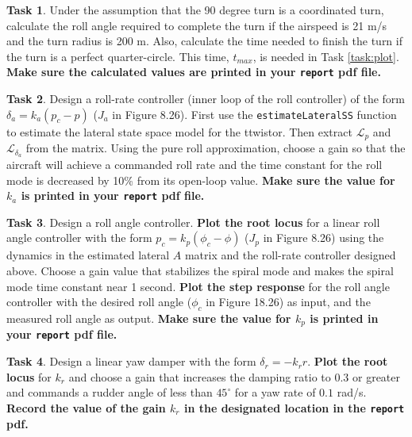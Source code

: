 \documentclass{article}
\theoremstyle{definition}
\newtheorem{task}{Task}
\begin{document}
\begin{task}
    Under the assumption that the 90 degree turn is a coordinated turn, calculate the roll angle required to complete the turn if the airspeed is 21 m/s and the turn radius is 200 m. Also, calculate the time needed to finish the turn if the turn is a perfect quarter-circle. This time, $t_{max}$, is needed in Task \ref{task:plot}. \textbf{Make sure the calculated values are printed in your \texttt{report} pdf file.}
\end{task}

\begin{task} \label{task:rollrate}
    Design a roll-rate controller (inner loop of the roll controller) of the form $\delta_a = k_a (p_c - p)$ ($J_a$ in Figure 8.26). First use the \texttt{estimateLateralSS} function to estimate the lateral state space model for the ttwistor. Then extract $\mathcal{L}_p$ and $\mathcal{L}_{\delta_a}$ from the matrix. Using the pure roll approximation, choose a gain so that the aircraft will achieve a commanded roll rate and the time constant for the roll mode is decreased by 10\% from its open-loop value.
    \textbf{Make sure the value for $k_a$ is printed in your \texttt{report} pdf file.}
\end{task}

\begin{task}
    Design a roll angle controller. \textbf{Plot the root locus} for a linear roll angle controller with the form $p_c = k_p (\phi_c - \phi)$ ($J_p$ in Figure 8.26) using the dynamics in the estimated lateral $A$ matrix and the roll-rate controller designed above. Choose a gain value that stabilizes the spiral mode and makes the spiral mode time constant near 1 second. \textbf{Plot the step response} for the roll angle controller with the desired roll angle ($\phi_c$ in Figure 18.26) as input, and the measured roll angle as output.
    \textbf{Make sure the value for $k_p$ is printed in your \texttt{report} pdf file.}
\end{task}

\begin{task} \label{task:yaw}
    Design a linear yaw damper with the form $\delta_r = -k_r r$. \textbf{Plot the root locus} for $k_r$ and choose a gain that increases the damping ratio to $0.3$ or greater and commands a rudder angle of less than $45^\circ$ for a yaw rate of $0.1$ rad/s. \textbf{Record the value of the gain $k_r$ in the designated location in the \texttt{report} pdf.}
\end{task}
\end{document}
